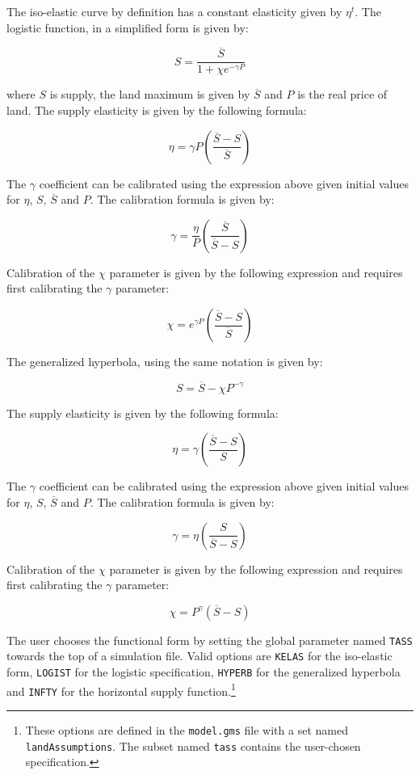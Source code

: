 \documentclass[11pt,letterpaper]{report}
\begin{document}
The iso-elastic curve by definition has a constant elasticity given by $\eta^t$.
The logistic function, in a simplified form is given by:

\[
S=\frac {\overbar{S}} {1+\chi e^{-\gamma P}}
\]

\noindent where $S$ is supply, the land maximum is given by $\overbar{S}$ and
$P$ is the real price of land. The supply elasticity is given by the following
formula:

\[
\eta = \gamma P \left( \frac {\overbar{S}-S}{\overbar{S}} \right)
\]

\noindent The $\gamma$ coefficient can be calibrated using the expression above
given initial values for $\eta$, $S$, $\overbar{S}$ and $P$. The calibration
formula is given by:

\[
\gamma = \frac{\eta} {P} \left( \frac {\overbar{S}} {\overbar{S}-S} \right)
\]

\noindent Calibration of the $\chi$ parameter is given by the following
expression and requires first calibrating the $\gamma$ parameter:

\[
\chi = e^{\gamma P} \left( \frac {\overbar{S}-S}{\overbar{S}} \right)
\]

The generalized hyperbola, using the same notation is given by:

\[
S= \overbar{S} - \chi P^{-\gamma}
\]

\noindent The supply elasticity is given by the following formula:

\[
\eta = \gamma \left( \frac {\overbar{S}-S}{{S}} \right)
\]

\noindent The $\gamma$ coefficient can be calibrated using the expression above
given initial values for $\eta$, $S$, $\overbar{S}$ and $P$. The calibration
formula is given by:

\[
\gamma = {\eta} \left( \frac {{S}} {\overbar{S}-S} \right)
\]

\noindent Calibration of the $\chi$ parameter is given by the following
expression and requires first calibrating the $\gamma$ parameter:

\[
\chi = P^\gamma \left( \overbar{S}-S \right)
\]

The user chooses the functional form by setting the global parameter named
\texttt{TASS} towards the top of a simulation file. Valid options are
\texttt{KELAS} for the iso-elastic form, \texttt{LOGIST} for the logistic
specification, \texttt{HYPERB} for the generalized hyperbola and \texttt{INFTY}
for the horizontal supply function.\footnote{These options are defined in the
\texttt{model.gms} file with a set named \texttt{landAssumptions}. The subset
named \texttt{tass} contains the user-chosen specification.}
\end{document}
